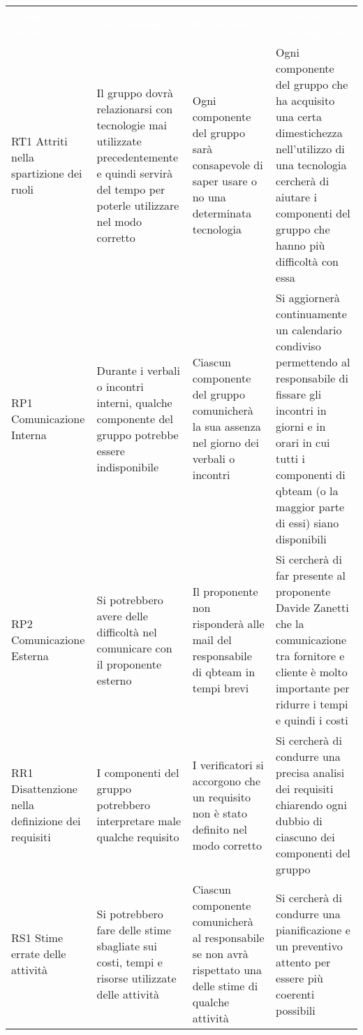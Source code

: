 {
\renewcommand{\arraystretch}{2}
\centering
\begin{longtable}{ C{2cm} C{4.5cm} C{4.5cm} C{4.5cm}}
\textcolor{white}{\textbf{Codice Nome}} & \textcolor{white}{\textbf{Descrizione}} & \textcolor{white}{\textbf{Rilevamento}} &  \textcolor{white}{\textbf{Piano di Contingenza}}\\	

RT1 Attriti nella spartizione dei ruoli & Il gruppo dovrà relazionarsi con tecnologie mai utilizzate precedentemente e quindi servirà del tempo per poterle utilizzare nel modo corretto & Ogni componente del gruppo sarà consapevole di saper usare o no una determinata tecnologia & Ogni componente del gruppo che ha acquisito una certa dimestichezza nell'utilizzo di una tecnologia cercherà di aiutare i componenti del gruppo che hanno più difficoltà con essa \\

RP1 Comunicazione Interna & Durante i verbali o incontri interni, qualche componente del gruppo potrebbe essere indisponibile & Ciascun componente del gruppo comunicherà la sua assenza nel giorno dei verbali o incontri & Si aggiornerà continuamente un calendario condiviso permettendo al responsabile di fissare gli incontri in giorni e in orari in cui tutti i componenti di qbteam (o la maggior parte di essi) siano disponibili \\ 

RP2 Comunicazione Esterna & Si potrebbero avere delle difficoltà nel comunicare con il proponente esterno & Il proponente non risponderà alle mail del responsabile di qbteam in tempi brevi & Si cercherà di far presente al proponente Davide Zanetti che la comunicazione tra fornitore e cliente è molto importante per ridurre i tempi e quindi i costi \\

RR1 Disattenzione nella definizione dei requisiti & I componenti del gruppo potrebbero interpretare male qualche requisito & I verificatori si accorgono che un requisito non è stato definito nel modo corretto & Si cercherà di condurre una precisa analisi dei requisiti chiarendo ogni dubbio di ciascuno dei componenti del gruppo \\

RS1 Stime errate delle attività & Si potrebbero fare delle stime sbagliate sui costi, tempi e risorse utilizzate delle attività & Ciascun componente comunicherà al responsabile se non avrà rispettato una delle stime di qualche attività & Si cercherà di condurre una pianificazione e un preventivo attento per essere più coerenti possibili \\


\end{longtable}}
